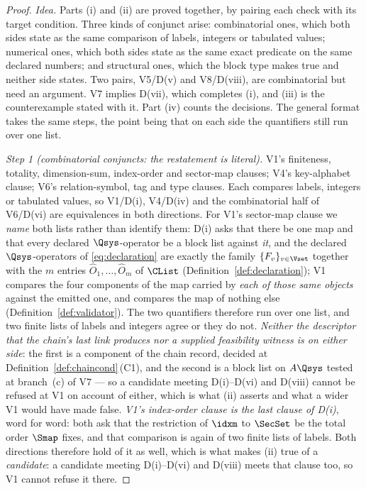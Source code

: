 \begin{proof}
\emph{Idea.} Parts (i) and (ii) are proved together, by pairing each check
with its target condition. Three kinds of conjunct arise: combinatorial ones,
which both sides state as the same comparison of labels, integers or
tabulated values; numerical ones, which both sides state as the same exact
predicate on the same declared numbers; and structural ones, which the block
type makes true and neither side states. Two pairs, V5/D(v) and V8/D(viii),
are combinatorial but need an argument. V7 implies D(vii), which completes
(i), and (iii) is the counterexample stated with it. Part (iv) counts the
decisions. The general format takes the same steps, the point being that on
each side the quantifiers still run over one list.

\emph{Step 1 (combinatorial conjuncts: the restatement is literal).} V1's
finiteness, totality, dimension-sum, index-order and sector-map clauses; V4's
key-alphabet clause; V6's relation-symbol, tag and type clauses. Each compares
labels, integers or tabulated values, so V1/D(i), V4/D(iv) and the
combinatorial half of V6/D(vi) are equivalences in both directions. For V1's
sector-map clause we \emph{name} both lists rather than identify them: D(i)
asks that there be one map and that every declared $\Qsys$-operator be a
block list against \emph{it}, and the declared $\Qsys$-operators of
\eqref{eq:declaration} are exactly the family $\{F_v\}_{v\in\Vset}$ together
with the $m$ entries $\hat O_1,\dots,\hat O_m$ of $\CList$
(Definition~\ref{def:declaration}); V1 compares the four components of the
map carried by \emph{each of those same objects} against the emitted one, and
compares the map of nothing else (Definition~\ref{def:validator}). The two
quantifiers therefore run over one list, and two finite lists of labels and
integers agree or they do not. \emph{Neither the descriptor that the chain's
last link produces nor a supplied feasibility witness is on either side}: the
first is a
component of the chain record, decided at
Definition~\ref{def:chaincond}\,(C1), and the second is a block list on
$A\Qsys$ tested at branch~(c) of V7 --- so a candidate meeting D(i)--D(vi)
and D(viii) cannot be refused at V1 on account of either, which is what (ii)
asserts and what a wider V1 would have made false. \emph{V1's index-order
clause is the last clause of D(i)}, word for word: both ask that the
restriction of $\idxm$ to $\SecSet$ be the total order $\Smap$ fixes, and
that comparison is again of two finite lists of labels. Both directions
therefore hold of it as well, which is what makes (ii) true of a
\emph{candidate}: a candidate meeting D(i)--D(vi) and D(viii) meets that
clause too, so V1 cannot refuse it there.


\end{proof}
